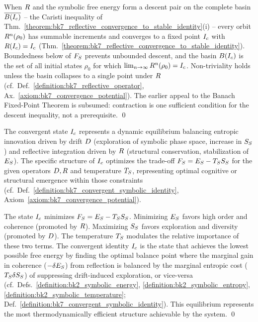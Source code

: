 \begin{demonstratio}
\label{demonstratio:bk7_banach_convergence_reflection}
When \(R\) and the symbolic free energy form a descent pair on the complete basin \(\overline{B(I_c)}\) -- the Caristi inequality of Thm.~\ref{theorem:bk7_reflective_convergence_to_stable_identity}(i) -- every orbit \(R^n(\rho_0)\) has summable increments and converges to a fixed point \(I_c\) with \(R(I_c)=I_c\) (Thm.~\ref{theorem:bk7_reflective_convergence_to_stable_identity}). Boundedness below of \(F_S\) prevents unbounded descent, and the basin \(B(I_c)\) is the set of all initial states \(\rho_0\) for which \(\lim_{n\to\infty}R^n(\rho_0)=I_c\). Non-triviality holds unless the basin collapses to a single point under \(R\) (cf.~Def.~\ref{definition:bk7_reflective_operator}, Ax.~\ref{axiom:bk7_convergence_potential}). The earlier appeal to the Banach Fixed-Point Theorem is subsumed: contraction is one sufficient condition for the descent inequality, not a prerequisite. \qed
\end{demonstratio}
\begin{corollary}
\label{corollary:bk7_stability_innovation_equilibrium}
The convergent state \(I_c\) represents a dynamic equilibrium balancing entropic innovation driven by drift \(D\) (exploration of symbolic phase space, increase in \(S_S\)) and reflective integration driven by \(R\) (structural conservation, stabilization of \(E_S\)). The specific structure of \(I_c\) optimizes the trade-off \(F_S = E_S - T_S S_S\) for the given operators \(D, R\) and temperature \(T_S\), representing optimal cognitive or structural emergence within those constraints (cf.~Def.~\ref{definition:bk7_convergent_symbolic_identity}, Axiom~\ref{axiom:bk7_convergence_potential}).
\end{corollary}
\begin{demonstratio}
\label{demonstratio:bk7_free_energy_balance_equilibrium}
The state \(I_c\) minimizes \(F_S = E_S - T_S S_S\). Minimizing \(E_S\) favors high order and coherence (promoted by \(R\)). Maximizing \(S_S\) favors exploration and diversity (promoted by \(D\)). The temperature \(T_S\) modulates the relative importance of these two terms. The convergent identity \(I_c\) is the state that achieves the lowest possible free energy by finding the optimal balance point where the marginal gain in coherence (\(-\delta E_S\)) from reflection is balanced by the marginal entropic cost (\(T_S \delta S_S\)) of suppressing drift-induced exploration, or vice-versa (cf.~Defs.~\ref{definition:bk2_symbolic_energy}, \ref{definition:bk2_symbolic_entropy}, \ref{definition:bk2_symbolic_temperature}; Def.~\ref{definition:bk7_convergent_symbolic_identity}). This equilibrium represents the most thermodynamically efficient structure achievable by the system. \qed
\end{demonstratio}
